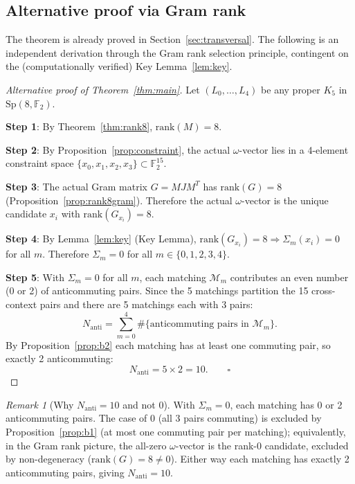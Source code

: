 \documentclass[11pt,a4paper]{article}
\theoremstyle{remark}
\newtheorem{remark}[theorem]{Remark}
\newcommand{\Sp}{\mathrm{Sp}}
\begin{document}
\subsection{Alternative proof via Gram rank}

The theorem is already proved in Section~\ref{sec:transversal}. The following is an
independent derivation through the Gram rank selection principle, contingent on the
(computationally verified) Key Lemma~\ref{lem:key}.

\begin{proof}[Alternative proof of Theorem~\ref{thm:main}]
Let $(L_0, \ldots, L_4)$ be any proper $K_5$ in $\Sp(8,\mathbb{F}_2)$.

\textbf{Step 1}: By Theorem~\ref{thm:rank8}, $\mathrm{rank}(M) = 8$.

\textbf{Step 2}: By Proposition~\ref{prop:constraint}, the actual
$\omega$-vector lies in a 4-element constraint space
$\{x_0, x_1, x_2, x_3\} \subset \mathbb{F}_2^{15}$.

\textbf{Step 3}: The actual Gram matrix $G = MJM^T$ has $\mathrm{rank}(G) = 8$
(Proposition~\ref{prop:rank8gram}).
Therefore the actual $\omega$-vector is the unique candidate $x_i$ with
$\mathrm{rank}(G_{x_i}) = 8$.

\textbf{Step 4}: By Lemma~\ref{lem:key} (Key Lemma),
$\mathrm{rank}(G_{x_i}) = 8 \Rightarrow \Sigma_m(x_i) = 0$ for all $m$.
Therefore $\Sigma_m = 0$ for all $m \in \{0,1,2,3,4\}$.

\textbf{Step 5}: With $\Sigma_m = 0$ for all $m$, each matching $\mathcal{M}_m$
contributes an even number (0 or 2) of anticommuting pairs.
Since the 5 matchings partition the 15 cross-context pairs and there are 5
matchings each with 3 pairs:
\[
  N_{\mathrm{anti}} = \sum_{m=0}^{4} \#\{\text{anticommuting pairs in } \mathcal{M}_m\}.
\]
By Proposition~\ref{prop:b2} each matching has at least one commuting pair, so
exactly 2 anticommuting:
\[
  N_{\mathrm{anti}} = 5 \times 2 = 10. \qquad \square
\]
\end{proof}

\begin{remark}[Why $N_{\mathrm{anti}} = 10$ and not 0]
With $\Sigma_m = 0$, each matching has 0 or 2 anticommuting pairs. The case of 0
(all 3 pairs commuting) is excluded by Proposition~\ref{prop:b1} (at most one
commuting pair per matching); equivalently, in the Gram rank picture, the all-zero
$\omega$-vector is the rank-0 candidate, excluded by non-degeneracy
($\mathrm{rank}(G)=8\neq 0$). Either way each matching has exactly 2 anticommuting
pairs, giving $N_{\mathrm{anti}}=10$.
\end{remark}
\end{document}

